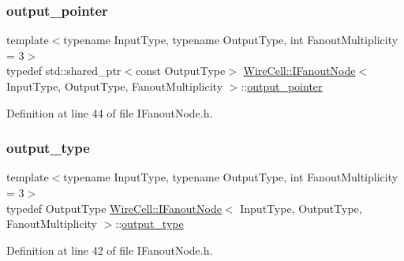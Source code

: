 \mbox{\label{class_wire_cell_1_1_i_fanout_node_a35939afef5c102eaee685b52c4beaf04}} 
\subsubsection{\texorpdfstring{output\+\_\+pointer}{output\_pointer}}
{\footnotesize\ttfamily template$<$typename Input\+Type, typename Output\+Type, int Fanout\+Multiplicity = 3$>$ \\
typedef std\+::shared\+\_\+ptr$<$const Output\+Type$>$ \hyperlink{class_wire_cell_1_1_i_fanout_node}{Wire\+Cell\+::\+I\+Fanout\+Node}$<$ Input\+Type, Output\+Type, Fanout\+Multiplicity $>$\+::\hyperlink{class_wire_cell_1_1_i_fanout_node_a35939afef5c102eaee685b52c4beaf04}{output\+\_\+pointer}}



Definition at line 44 of file I\+Fanout\+Node.\+h.

\mbox{\label{class_wire_cell_1_1_i_fanout_node_ac0d2826bcbce6d163d2dbab937f41828}} 
\subsubsection{\texorpdfstring{output\+\_\+type}{output\_type}}
{\footnotesize\ttfamily template$<$typename Input\+Type, typename Output\+Type, int Fanout\+Multiplicity = 3$>$ \\
typedef Output\+Type \hyperlink{class_wire_cell_1_1_i_fanout_node}{Wire\+Cell\+::\+I\+Fanout\+Node}$<$ Input\+Type, Output\+Type, Fanout\+Multiplicity $>$\+::\hyperlink{class_wire_cell_1_1_i_fanout_node_ac0d2826bcbce6d163d2dbab937f41828}{output\+\_\+type}}



Definition at line 42 of file I\+Fanout\+Node.\+h.

\mbox{\label{class_wire_cell_1_1_i_fanout_node_a650cda83709781daac2d67af7c3706df}} 

